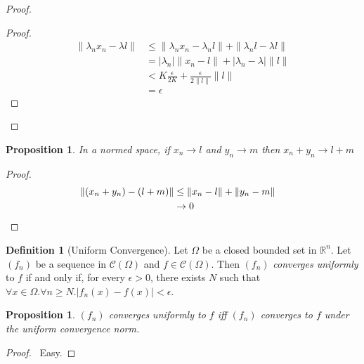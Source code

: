 \documentclass{book}
\let\qed\relax
\newtheorem{prop}[ax]{Proposition}
\theoremstyle{definition}
\newtheorem{df}[ax]{Definition}
\begin{document}
\begin{proof}
\pf
{}
\begin{proof}
	\pf
	\begin{align*}
		\| \lambda_n x_n - \lambda l \| & \leq \| \lambda_n x_n - \lambda_n l \| + \| \lambda_n l - \lambda l \| \\
		& = |\lambda_n| \| x_n - l \| + | \lambda_n - \lambda | \|l\| \\
		& < K \frac{\epsilon}{2K} + \frac{\epsilon}{2 \|l\|} \|l\| \\
		& = \epsilon
	\end{align*}
\end{proof}
\qed
\end{proof}

\begin{prop}
In a normed space, if $x_n \rightarrow l$ and $y_n \rightarrow m$ then $x_n + y_n \rightarrow l + m$
\end{prop}

\begin{proof}
\pf
\begin{align*}
\| (x_n + y_n) - (l + m) \| & \leq \| x_n - l \| + \| y_n - m \| \\
& \rightarrow 0 & \qed
\end{align*}
\end{proof}

\begin{df}[Uniform Convergence]
Let $\Omega$ be a closed bounded set in $\mathbb{R}^n$. Let $(f_n)$ be a sequence in $\mathcal{C}(\Omega)$ and $f \in \mathcal{C}(\Omega)$. Then $(f_n)$ \emph{converges uniformly} to $f$ if and only if, for every $\epsilon > 0$, there exists $N$ such that $\forall x \in \Omega. \forall n \geq N. |f_n(x) - f(x)| < \epsilon$.
\end{df}

\begin{prop}
$(f_n)$ converges uniformly to $f$ iff $(f_n)$ converges to $f$ under the uniform convergence norm.
\end{prop}

\begin{proof}
\pf\ Easy. \qed
\end{proof}
\end{document}
